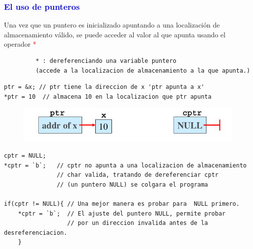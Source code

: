 \documentclass[serif, professionalfont]{beamer}
\newcommand\Fontvi{\fontsize{10}{9.2}\selectfont}
\newcommand\Fontvia{\fontsize{8}{9.2}\selectfont}
\begin{document}
\begin{frame}[fragile]{}
	\frametitle{\textcolor{blue}{\hspace{4.0 cm} El uso de punteros}}
\Fontvi
Una vez que un puntero es  inicializado  apuntando  a una localizaci\'on de almacenamiento v\'alido, se puede acceder al valor al que apunta usando el operador \textcolor{red}{*}
\Fontvia


\begin{Verbatim}
         * : dereferenciando una variable puntero
         (accede a la localizacion de almacenamiento a la que apunta.)
\end{Verbatim}

\begin{verbatim}
ptr = &x; // ptr tiene la direccion de x 'ptr apunta a x'
*ptr = 10  // almacena 10 en la localizacion que ptr apunta
\end{verbatim}

\begin{figure}[h]
	\centering
	\includegraphics[scale=.3]{j5.png}
\end{figure}

\begin{verbatim}
cptr = NULL;  
*cptr = `b`;   // cptr no apunta a una localizacion de almacenamiento 
               // char valida, tratando de dereferenciar cptr  
               // (un puntero NULL) se colgara el programa

if(cptr != NULL){ // Una mejor manera es probar para  NULL primero.
	*cptr = `b`;  // El ajuste del puntero NULL, permite probar 
	              // por un direccion invalida antes de la  desreferenciacion.
	}
\end{verbatim}
\end{frame}
\end{document}
